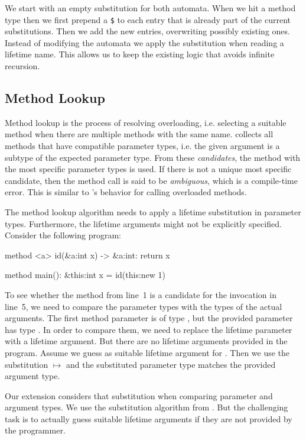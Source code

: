 We start with an empty substitution for both automata.
When we hit a method type then we first prepend a \texttt{\$} to each entry that is already part of the current substitutions.
Then we add the new entries, overwriting possibly existing ones.
Instead of modifying the automata we apply the substitution when reading a lifetime name.
This allows us to keep the existing logic that avoids infinite recursion.


\subsection{Method Lookup}\label{section:substitution-lookup}
Method lookup is the process of resolving overloading, i.e. selecting a suitable method when there are multiple methods with the same name.
\whiley collects all methods that have compatible parameter types, i.e. the given argument is a subtype of the expected parameter type.
From these \emph{candidates}, the method with the most specific parameter types is used.
If there is not a unique most specific candidate, then the method call is said to be \emph{ambiguous}, which is a compile-time error.
This is similar to \java's behavior for calling overloaded methods.

The method lookup algorithm needs to apply a lifetime substitution in parameter types.
Furthermore, the lifetime arguments might not be explicitly specified.
Consider the following program:

\begin{whileycode}
method <a> id(&a:int x) -> &a:int:
	return x

method main():
	&this:int x = id(this:new 1)
\end{whileycode}

To see whether the method from line~1 is a candidate for the invocation in line~5, we need to compare the parameter types with the types of the actual arguments.
The first method parameter is of type , but the provided parameter has type .
In order to compare them, we need to replace the lifetime parameter  with a lifetime argument.
But there are no lifetime arguments provided in the program.
Assume we guess  as suitable lifetime argument for .
Then we use the substitution  $\mapsto$  and the substituted parameter type  matches the provided argument type.

Our extension considers that substitution when comparing parameter and argument types.
We use the substitution algorithm from .
But the challenging task is to actually guess suitable lifetime arguments if they are not provided by the programmer.

